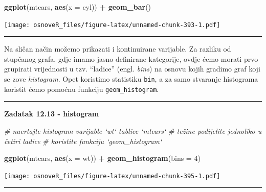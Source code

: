 \documentclass[]{book}
\newenvironment{Shaded}{\begin{snugshade}}{\end{snugshade}}
\newcommand{\KeywordTok}[1]{\textcolor[rgb]{0.13,0.29,0.53}{\textbf{#1}}}
\newcommand{\DataTypeTok}[1]{\textcolor[rgb]{0.13,0.29,0.53}{#1}}
\newcommand{\DecValTok}[1]{\textcolor[rgb]{0.00,0.00,0.81}{#1}}
\newcommand{\StringTok}[1]{\textcolor[rgb]{0.31,0.60,0.02}{#1}}
\newcommand{\CommentTok}[1]{\textcolor[rgb]{0.56,0.35,0.01}{\textit{#1}}}
\newcommand{\OperatorTok}[1]{\textcolor[rgb]{0.81,0.36,0.00}{\textbf{#1}}}
\newcommand{\NormalTok}[1]{#1}
\theoremstyle{definition}
\theoremstyle{definition}
\theoremstyle{definition}
\theoremstyle{remark}
\begin{document}
\begin{Shaded}
\begin{Highlighting}[]
\KeywordTok{ggplot}\NormalTok{(mtcars, }\KeywordTok{aes}\NormalTok{(}\DataTypeTok{x =}\NormalTok{ cyl)) }\OperatorTok{+}\StringTok{ }\KeywordTok{geom_bar}\NormalTok{()}
\end{Highlighting}
\end{Shaded}

\texttt{[image: osnoveR\_files/figure-latex/unnamed-chunk-393-1.pdf]}

\begin{center}\rule{0.5\linewidth}{\linethickness}\end{center}

Na sličan način možemo prikazati i kontinuirane varijable. Za razliku od
stupčanog grafa, gdje imamo jasno definirane kategorije, ovdje ćemo
morati prvo grupirati vrijednosti u tzv. ``ladice'' (engl. \emph{bins})
na osnovu kojih gradimo graf koji se zove \emph{histogram}. Opet
koristimo statistiku \texttt{bin}, a za samo stvaranje histograma
koristit ćemo pomoćnu funkciju \texttt{geom\_histogram}.

\begin{center}\rule{0.5\linewidth}{\linethickness}\end{center}

\textbf{Zadatak 12.13 - histogram}

\begin{Shaded}
\begin{Highlighting}[]
\CommentTok{# nacrtajte histogram varijable `wt` tablice `mtcars`}
\CommentTok{# težine podijelite jednoliko u četiri ladice}
\CommentTok{# koristite funkciju `geom_histogram`}
\end{Highlighting}
\end{Shaded}

\begin{Shaded}
\begin{Highlighting}[]
\KeywordTok{ggplot}\NormalTok{(mtcars, }\KeywordTok{aes}\NormalTok{(}\DataTypeTok{x =}\NormalTok{ wt)) }\OperatorTok{+}\StringTok{ }\KeywordTok{geom_histogram}\NormalTok{(}\DataTypeTok{bins =} \DecValTok{4}\NormalTok{)}
\end{Highlighting}
\end{Shaded}

\texttt{[image: osnoveR\_files/figure-latex/unnamed-chunk-395-1.pdf]}

\begin{center}\rule{0.5\linewidth}{\linethickness}\end{center}
\end{document}

